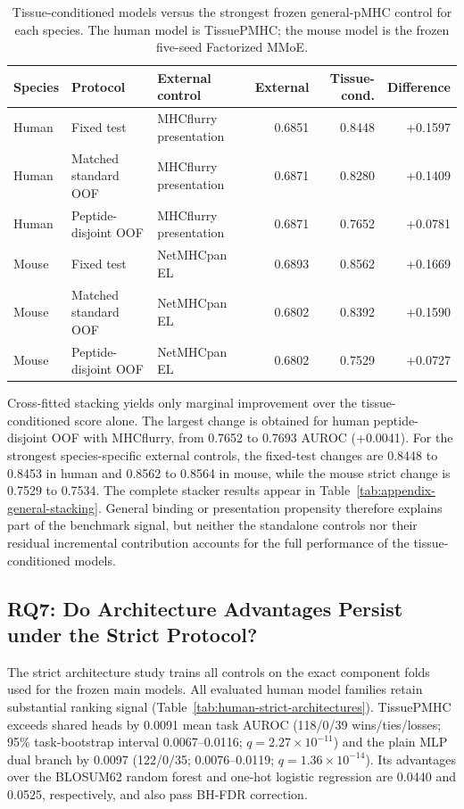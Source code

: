 \begin{table}[tbp]
\centering
\caption{Tissue-conditioned models versus the strongest frozen general-pMHC control for each species. The human model is TissuePMHC; the mouse model is the frozen five-seed Factorized MMoE.}
\label{tab:general-pmhc-gap}
\scriptsize
\setlength{\tabcolsep}{2pt}
\begin{tabular}{lllrrr}
\toprule
Species & Protocol & External control & External & Tissue-cond. & Difference \\
\midrule
Human & Fixed test & MHCflurry presentation & 0.6851 & 0.8448 & +0.1597 \\
Human & Matched standard OOF & MHCflurry presentation & 0.6871 & 0.8280 & +0.1409 \\
Human & Peptide-disjoint OOF & MHCflurry presentation & 0.6871 & 0.7652 & +0.0781 \\
Mouse & Fixed test & NetMHCpan EL & 0.6893 & 0.8562 & +0.1669 \\
Mouse & Matched standard OOF & NetMHCpan EL & 0.6802 & 0.8392 & +0.1590 \\
Mouse & Peptide-disjoint OOF & NetMHCpan EL & 0.6802 & 0.7529 & +0.0727 \\
\bottomrule
\end{tabular}
\end{table}

Cross-fitted stacking yields only marginal improvement over the tissue-conditioned score alone. The largest change is obtained for human peptide-disjoint OOF with MHCflurry, from 0.7652 to 0.7693 AUROC (+0.0041). For the strongest species-specific external controls, the fixed-test changes are 0.8448 to 0.8453 in human and 0.8562 to 0.8564 in mouse, while the mouse strict change is 0.7529 to 0.7534. The complete stacker results appear in Table~\ref{tab:appendix-general-stacking}. General binding or presentation propensity therefore explains part of the benchmark signal, but neither the standalone controls nor their residual incremental contribution accounts for the full performance of the tissue-conditioned models.

\subsection{RQ7: Do Architecture Advantages Persist under the Strict Protocol?}

The strict architecture study trains all controls on the exact component folds used for the frozen main models. All evaluated human model families retain substantial ranking signal (Table~\ref{tab:human-strict-architectures}). TissuePMHC exceeds shared heads by 0.0091 mean task AUROC (118/0/39 wins/ties/losses; 95\% task-bootstrap interval 0.0067--0.0116; \(q=2.27\times10^{-11}\)) and the plain MLP dual branch by 0.0097 (122/0/35; 0.0076--0.0119; \(q=1.36\times10^{-14}\)). Its advantages over the BLOSUM62 random forest and one-hot logistic regression are 0.0440 and 0.0525, respectively, and also pass BH-FDR correction.

